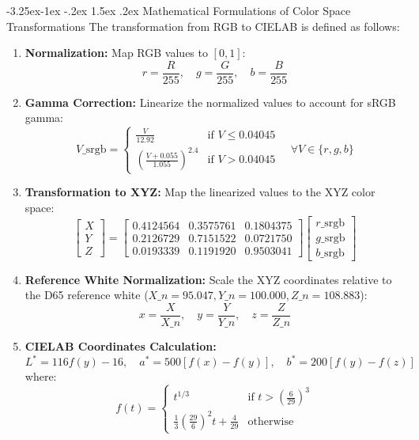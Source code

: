 \documentclass[12pt,a4paper]{article}
\makeatletter
\renewcommand\paragraph{\@startsection{paragraph}{4}{\z@}%
  {-3.25ex\@plus -1ex \@minus -.2ex}%
  {1.5ex \@plus .2ex}%
  {\normalfont\normalsize\bfseries}}
\makeatother
\begin{document}
\paragraph{Mathematical Formulations of Color Space Transformations}
The transformation from RGB to CIELAB is defined as follows:
\begin{enumerate}
    \item \textbf{Normalization:} Map RGB values to $[0,1]$:
        \[
        r = \frac{R}{255}, \quad g = \frac{G}{255}, \quad b = \frac{B}{255}
        \]
    \item \textbf{Gamma Correction:} Linearize the normalized values to account for sRGB gamma:
        \[
        V\_{\text{srgb}} = \begin{cases}
        \frac{V}{12.92} & \text{if } V \le 0.04045 \\
        \left(\frac{V + 0.055}{1.055}\right)^{2.4} & \text{if } V > 0.04045
        \end{cases} \quad \forall V \in \{r, g, b\}
        \]
    \item \textbf{Transformation to XYZ:} Map the linearized values to the XYZ color space:
        \[
        \begin{bmatrix} X \\ Y \\ Z \end{bmatrix} = \begin{bmatrix}
        0.4124564 & 0.3575761 & 0.1804375 \\
        0.2126729 & 0.7151522 & 0.0721750 \\
        0.0193339 & 0.1191920 & 0.9503041
        \end{bmatrix} \begin{bmatrix} r\_{\text{srgb}} \\ g\_{\text{srgb}} \\ b\_{\text{srgb}} \end{bmatrix}
        \]
    \item \textbf{Reference White Normalization:} Scale the XYZ coordinates relative to the D65 reference white ($X\_n=95.047, Y\_n=100.000, Z\_n=108.883$):
        \[
        x = \frac{X}{X\_n}, \quad y = \frac{Y}{Y\_n}, \quad z = \frac{Z}{Z\_n}
        \]
    \item \textbf{CIELAB Coordinates Calculation:}
        \[
        L^* = 116 f(y) - 16, \quad a^* = 500 [f(x) - f(y)], \quad b^* = 200 [f(y) - f(z)]
        \]
        where:
        \[
        f(t) = \begin{cases}
        t^{1/3} & \text{if } t > \left(\frac{6}{29}\right)^3 \\
        \frac{1}{3}\left(\frac{29}{6}\right)^2 t + \frac{4}{29} & \text{otherwise}
        \end{cases}
        \]
\end{enumerate}
\end{document}

